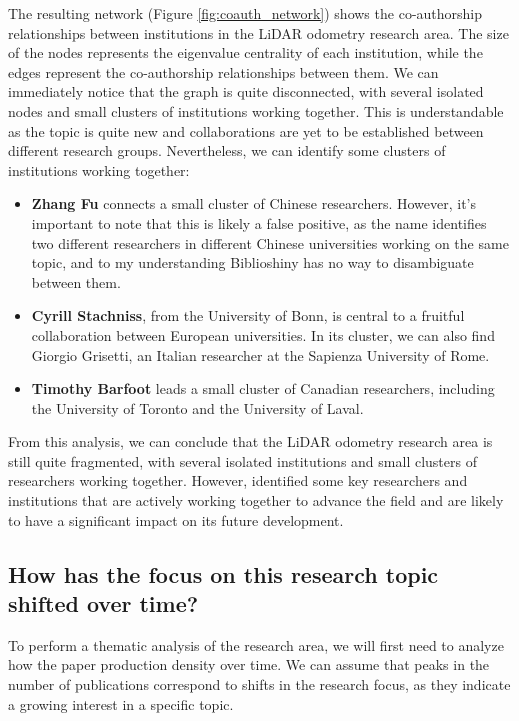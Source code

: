 \documentclass{article}
\begin{document}
The resulting network (Figure \ref{fig:coauth_network}) shows the co-authorship relationships between institutions in the LiDAR odometry research area. The size of the nodes represents the eigenvalue centrality of each institution, while the edges represent the co-authorship relationships between them. We can immediately notice that the graph is quite disconnected, with several isolated nodes and small clusters of institutions working together. This is understandable as the topic is quite new and collaborations are yet to be established between different research groups. Nevertheless, we can identify some clusters of institutions working together:
\begin{itemize}
    \item \textbf{Zhang Fu} connects a small cluster of Chinese researchers. However, it's important to note that this is likely a false positive, as the name identifies two different researchers in different Chinese universities working on the same topic, and to my understanding Biblioshiny has no way to disambiguate between them.
    \item \textbf{Cyrill Stachniss}, from the University of Bonn, is central to a fruitful collaboration between European universities. In its cluster, we can also find Giorgio Grisetti, an Italian researcher at the Sapienza University of Rome.
    \item \textbf{Timothy Barfoot} leads a small cluster of Canadian researchers, including the University of Toronto and the University of Laval.
\end{itemize}

From this analysis, we can conclude that the LiDAR odometry research area is still quite fragmented, with several isolated institutions and small clusters of researchers working together. However, identified some key researchers and institutions that are actively working together to advance the field and are likely to have a significant impact on its future development.


\subsection{How has the focus on this research topic shifted over time?}
To perform a thematic analysis of the research area, we will first need to analyze how the paper production density over time. We can assume that peaks in the number of publications correspond to shifts in the research focus, as they indicate a growing interest in a specific topic.
\end{document}
